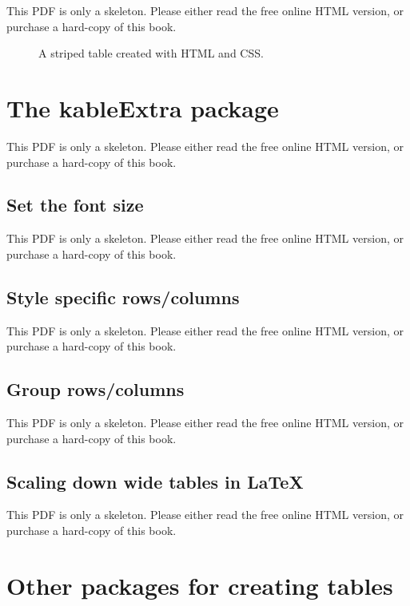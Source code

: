 \documentclass[
  11pt,
]{krantz}
\begin{document}
This PDF is only a skeleton. Please either read the free online HTML version, or purchase a hard-copy of this book.

\begin{figure}\caption{A striped table created with HTML and CSS.}\end{figure}

\section{\texorpdfstring{The \textbf{kableExtra} package}{The kableExtra package}}\label{kableextra}

This PDF is only a skeleton. Please either read the free online HTML version, or purchase a hard-copy of this book.

\subsection{Set the font size}\label{set-the-font-size}

This PDF is only a skeleton. Please either read the free online HTML version, or purchase a hard-copy of this book.

\subsection{Style specific rows/columns}\label{style-specific-rowscolumns}

This PDF is only a skeleton. Please either read the free online HTML version, or purchase a hard-copy of this book.

\subsection{Group rows/columns}\label{group-rowscolumns}

This PDF is only a skeleton. Please either read the free online HTML version, or purchase a hard-copy of this book.

\subsection{Scaling down wide tables in LaTeX}\label{scaling-down-wide-tables-in-latex}

This PDF is only a skeleton. Please either read the free online HTML version, or purchase a hard-copy of this book.

\section{Other packages for creating tables}\label{table-other}
\end{document}
